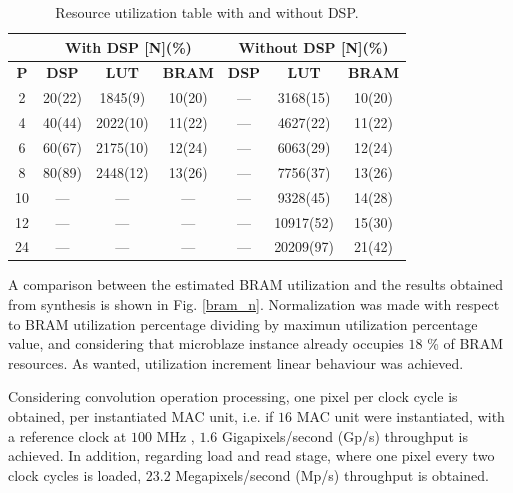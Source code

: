 \documentclass[conference,compsoc]{IEEEtran}
\begin{document}
\begin{table}[!t]
\renewcommand{\arraystretch}{1.3}
\caption{Resource utilization table with and without DSP.}
\label{res_table}
\centering
\begin{tabular}{|c|c|c|c|c|c|c|}
  \hline
  & \multicolumn{3}{c|}{\textbf{With DSP [N](\%)}} & \multicolumn{3}{c|}{\textbf{Without DSP [N](\%)}} \\ \hline
  \textbf{P}  & \textbf{DSP}            & \textbf{LUT}        & \textbf{BRAM}       & \textbf{DSP}         & \textbf{LUT}           & \textbf{BRAM}         \\ \hline
  2  & 20(22)         & 1845(9)    & 10(20)     & ---         & 3168(15)      & 10(20)         \\ \hline
  4  & 40(44)         & 2022(10)   & 11(22)     & ---         & 4627(22)      & 11(22)         \\ \hline
  6  & 60(67)         & 2175(10)   & 12(24)     & ---         & 6063(29)      & 12(24)         \\ \hline
  8  & 80(89)         & 2448(12)   & 13(26)     & ---         & 7756(37)      & 13(26)         \\ \hline
  10 & ---            & ---        & ---        & ---         & 9328(45)      & 14(28)         \\ \hline
  12 & ---            & ---        & ---        & ---         & 10917(52)     & 15(30)         \\ \hline
  24 & ---            & ---        & ---        & ---         & 20209(97)     & 21(42)         \\ \hline
\end{tabular}           
\end{table}
  

A comparison between the estimated BRAM utilization and the results obtained
from synthesis is shown in Fig. \ref{bram_n}. Normalization was made with respect to BRAM utilization percentage dividing by maximun utilization 
percentage value, and considering that microblaze instance already occupies $18$ \% of BRAM resources. As wanted, utilization increment linear behaviour was achieved. 

Considering convolution operation processing, one pixel per clock cycle is obtained, per instantiated MAC unit, i.e. if $16$ MAC unit were instantiated,
with a reference clock at $100$ MHz , $1.6$ Gigapixels/second (Gp/s) throughput is achieved. In addition, regarding load and read stage, where one pixel every two
 clock cycles is loaded, $23.2$ Megapixels/second (Mp/s) throughput is obtained.
\end{document}

